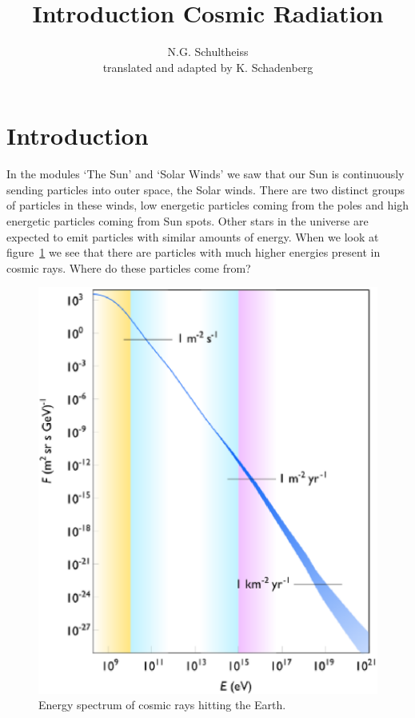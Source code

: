 \documentclass[12pt,a4paper]{article}
\author{N.G. Schultheiss \\ translated and adapted by K. Schadenberg}
\date{}
\title{Introduction Cosmic Radiation}
\numberwithin{equation}{section}
\numberwithin{figure}{section}
\numberwithin{table}{section}
\begin{document}
\maketitle

\section{Introduction}
In the modules `The Sun' and `Solar Winds' we saw that our Sun is continuously sending particles into outer space, the Solar winds. There are two distinct groups of particles in these winds, low energetic particles coming from the poles and high energetic particles coming from Sun spots. Other stars in the universe are expected to emit particles with similar amounts of energy. When we look at figure~\ref{fig:spectrum} we see that there are particles with much higher energies present in cosmic rays. Where do these particles come from?

\begin{figure}\begin{center}
\includegraphics[scale=0.75]{Cosmic_ray_flux_versus_particle_energy.svg.eps}%
\caption{Energy spectrum of cosmic rays hitting the Earth.}\label{fig:spectrum}
\end{center}\end{figure}
\end{document}
